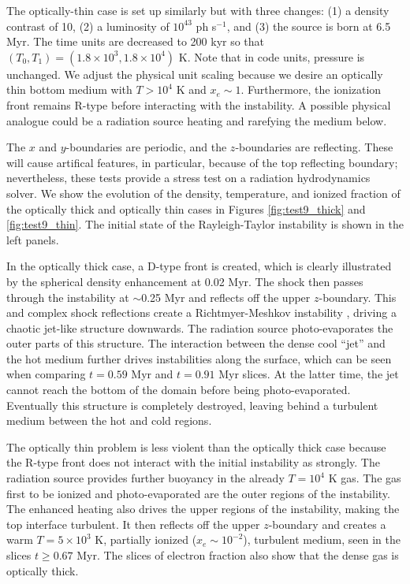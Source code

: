 \documentclass[useAMS,usenatbib,a4paper]{mn2e}
\begin{document}
The optically-thin case is set up similarly but with three changes:
(1) a density contrast of 10, (2) a luminosity of $10^{43}$ ph
s$^{-1}$, and (3) the source is born at 6.5 Myr.  The time units are
decreased to 200 kyr so that $(T_0, T_1) = (1.8 \times 10^3, 1.8
\times 10^4)$ K.  Note that in code units, pressure is unchanged.  We
adjust the physical unit scaling because we desire an optically thin
bottom medium with $T > 10^4$ K and $x_e \sim 1$.  Furthermore, the
ionization front remains R-type before interacting with the
instability.  A possible physical analogue could be a radiation source
heating and rarefying the medium below.

The $x$ and $y$-boundaries are periodic, and the $z$-boundaries are
reflecting.  These will cause artifical features, in particular,
because of the top reflecting boundary; nevertheless, these tests
provide a stress test on a radiation hydrodynamics solver.  We show
the evolution of the density, temperature, and ionized fraction of the
optically thick and optically thin cases in Figures
\ref{fig:test9_thick} and \ref{fig:test9_thin}.  The initial state of
the Rayleigh-Taylor instability is shown in the left panels.

In the optically thick case, a D-type front is created, which is
clearly illustrated by the spherical density enhancement at 0.02 Myr.
The shock then passes through the instability at $\sim$0.25 Myr and
reflects off the upper $z$-boundary.  This and complex shock
reflections create a Richtmyer-Meshkov instability \citep[see][for a
review]{RMI}, driving a chaotic jet-like structure downwards.  The
radiation source photo-evaporates the outer parts of this structure.
The interaction between the dense cool ``jet'' and the hot medium
further drives instabilities along the surface, which can be seen when
comparing $t = 0.59$ Myr and $t = 0.91$ Myr slices.  At the latter
time, the jet cannot reach the bottom of the domain before being
photo-evaporated.  Eventually this structure is completely destroyed,
leaving behind a turbulent medium between the hot and cold regions.

The optically thin problem is less violent than the optically thick
case because the R-type front does not interact with the initial
instability as strongly.  The radiation source provides further
buoyancy in the already $T=10^4$ K gas.  The gas first to be ionized
and photo-evaporated are the outer regions of the instability.  The
enhanced heating also drives the upper regions of the instability,
making the top interface turbulent.  It then reflects off the upper
$z$-boundary and creates a warm $T = 5 \times 10^3$ K, partially
ionized ($x_e \sim 10^{-2}$), turbulent medium, seen in the slices $t
\ge 0.67$ Myr.  The slices of electron fraction also show that the
dense gas is optically thick.
\end{document}
